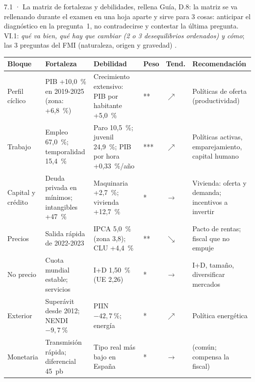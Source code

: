 \begin{complemento}{7.1 · La matriz de fortalezas y debilidades, rellena}
 Guía, D.8: la matriz se va rellenando durante el examen en una hoja aparte y sirve para 3 cosas: anticipar el diagnóstico en la pregunta~1, no contradecirse y contestar la última pregunta. VI.1: \emph{qué va bien, qué hay que cambiar (2 o 3 desequilibrios ordenados) y cómo}; las 3 preguntas del FMI (naturaleza, origen y gravedad) \parencite{FMI2013CaseStudy}.

\begin{tablacaja}
\centering\scriptsize
\renewcommand{\arraystretch}{0.98}\setlength{\tabcolsep}{4pt}
\caption{Matriz de fortalezas y debilidades de España (examen de ejemplo)}\label{tab:matriz-espana}
\begin{tabular}{>{\raggedright\arraybackslash}p{2.0cm}>{\raggedright\arraybackslash}p{3.3cm}>{\raggedright\arraybackslash}p{3.6cm}>{\centering\arraybackslash}p{0.7cm}>{\centering\arraybackslash}p{0.8cm}>{\raggedright\arraybackslash}p{3.4cm}}
\toprule
\rowcolor{tceeazulpalido}
\textbf{Bloque} & \textbf{\textcolor{tceeverde}{Fortaleza}} & \textbf{\textcolor{tceerojo}{Debilidad}} & \textbf{Peso} & \textbf{Tend.} & \textbf{Recomendación} \\
\midrule
Perfil cíclico & PIB +10,0~\% en 2019-2025 (zona: +6,8~\%) & Crecimiento extensivo: PIB por habitante +5,0~\% & ** & $\nearrow$ & Políticas de oferta (productividad) \\
Trabajo & Empleo 67,0~\%; temporalidad 15,4~\% & Paro 10,5~\%; juvenil 24,9~\%; PIB por hora +0,33~\%/año & *** & $\nearrow$ & Políticas activas, emparejamiento, capital humano \\
Capital y crédito & Deuda privada en mínimos; intangibles +47~\% & Maquinaria +2,7~\%; vivienda +12,7~\% & * & $\rightarrow$ & Vivienda: oferta y demanda; incentivos a invertir \\
Precios & Salida rápida de 2022-2023 & IPCA 5,0~\% (zona 3,8); CLU +4,4~\% & ** & $\searrow$ & Pacto de rentas; fiscal que no empuje \\
No precio & Cuota mundial estable; servicios & I+D 1,50~\% (UE 2,26) & * & $\rightarrow$ & I+D, tamaño, diversificar mercados \\
Exterior & Superávit desde 2012; NENDI $-9{,}7~\%$ & PIIN $-42{,}7~\%$; energía & * & $\nearrow$ & Política energética \\
Monetaria & Transmisión rápida; diferencial 45~pb & Tipo real más bajo en España & * & $\rightarrow$ & (común; compensa la fiscal) \\

\end{tabular}
\end{tablacaja}
\end{complemento}
